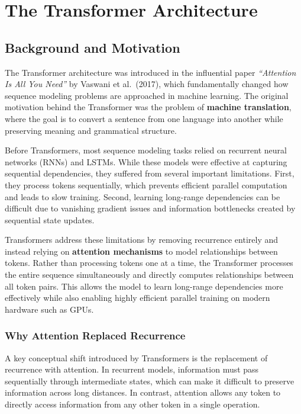 \documentclass[11pt]{article}
\begin{document}
\section{The Transformer Architecture}

\subsection{Background and Motivation}

The Transformer architecture was introduced in the influential paper \emph{``Attention Is All You Need''} by Vaswani et al.\ (2017), which fundamentally changed how sequence modeling problems are approached in machine learning. The original motivation behind the Transformer was the problem of \textbf{machine translation}, where the goal is to convert a sentence from one language into another while preserving meaning and grammatical structure.

Before Transformers, most sequence modeling tasks relied on recurrent neural networks (RNNs) and LSTMs. While these models were effective at capturing sequential dependencies, they suffered from several important limitations. First, they process tokens sequentially, which prevents efficient parallel computation and leads to slow training. Second, learning long-range dependencies can be difficult due to vanishing gradient issues and information bottlenecks created by sequential state updates.

Transformers address these limitations by removing recurrence entirely and instead relying on \textbf{attention mechanisms} to model relationships between tokens. Rather than processing tokens one at a time, the Transformer processes the entire sequence simultaneously and directly computes relationships between all token pairs. This allows the model to learn long-range dependencies more effectively while also enabling highly efficient parallel training on modern hardware such as GPUs.

\subsubsection{Why Attention Replaced Recurrence}

A key conceptual shift introduced by Transformers is the replacement of recurrence with attention. In recurrent models, information must pass sequentially through intermediate states, which can make it difficult to preserve information across long distances. In contrast, attention allows any token to directly access information from any other token in a single operation.
\end{document}
